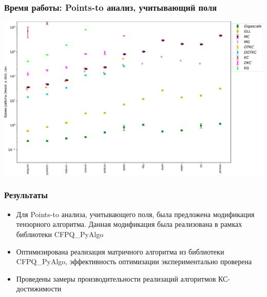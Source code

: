 \documentclass[x11names,dvipsnames,table,aspectratio=169]{beamer}
\begin{document}
\begin{frame}
  \transwipe[direction=90]
  \frametitle{Время работы: Points-to анализ, учитывающий поля}
  
  \begin{center}
      \includegraphics[height=.85\textheight]{pictures/java_time.pdf}
  \end{center}

\end{frame}


\begin{frame}
  \transwipe[direction=90]
  \frametitle{Результаты}
  \begin{itemize}
    \item Для Points-to анализа, учитывающего поля, была предложена модификация тензорного алгоритма. Данная модификация была реализована в рамках библиотеки CFPQ\_PyAlgo
    \item Оптимизирована реализация матричного алгоритма из библиотеки CFPQ\_PyAlgo, эффективность оптимизации экспериментально проверена
    \item Проведены замеры производительности реализаций алгоритмов КС-достижимости
  \end{itemize}

\end{frame}


\appendix
\end{document}
